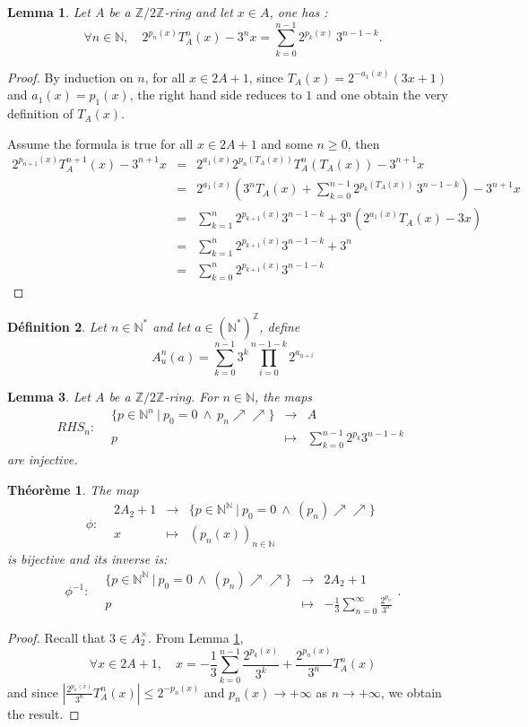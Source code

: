 \documentclass[12pt,a4paper]{article}
\newtheorem{lem}{Lemma}[section]
\newtheorem{defi}[lem]{Définition}
\newtheorem{theo}{Théorème}
\newcommand{\fonction}[5]{\displaystyle#1:\begin{array}{l|rcl}
& \displaystyle #2 & \longrightarrow & \displaystyle #3 \\
    & \displaystyle #4 & \longmapsto & \displaystyle #5 \end{array}}
\def\NN{\mathbb{N}}
\def\ZZ{\mathbb{Z}}
\begin{document}
\begin{lem}\label{lem:base}Let $A$ be a $\ZZ/2\ZZ$-ring and let $x\in A$, one has : 
$$\forall n\in \NN, \quad 2^{p_n(x)}T_A^n(x)-3^n x = \sum_{k=0}^{n-1} 2^{p_k(x)}\,3^{n-1-k} .$$
\end{lem}
\begin{proof} 
By induction on $n$, for all $x\in 2A+1$, since $T_A(x) = 2^{-a_1(x)}(3x+1)$ and $a_1(x)=p_1(x)$, the right hand side reduces to $1$ and one obtain the very definition of $T_A(x)$.

Assume the formula is true for all $x\in 2A+1$ and some $n \geq 0$, then 
\begin{eqnarray*}
2^{p_{n+1}(x)}T_A^{n+1}(x)-3^{n+1} x &=& 2^{a_{1}(x)} 2^{p_n(T_A(x))} T_A^n( T_A(x))-3^{n+1}x\\&=& 2^{a_1(x)} \left(3^n T_A(x)+ \sum_{k=0}^{n-1} 2^{p_k(T_A(x))}\,3^{n-1-k}  \right) - 3^{n+1}x  \\&=& \sum_{k=1}^{n} 2^{p_{k+1}(x)}3^{n-1-k}+3^n\left( 2^{a_1(x)}T_A(x)-3x\right)
\\&=&\sum_{k=1}^{n} 2^{p_{k+1}(x)}3^{n-1-k}+3^n 
\\&=& \sum_{k=0}^{n} 2^{p_{k+1}(x)}3^{n-1-k}
 \end{eqnarray*}
\end{proof}
\begin{defi}\label{def:define_n__n_}
Let $n\in\NN^*$ and let $a\in (\NN^*)^\ZZ$, define $$ A_{u}^n(a)=\sum_{k=0}
^{n-1}3^k\prod_{i=0}^{n-1-k}2^{a_{u+i}} $$ 
\end{defi}
\begin{lem}\label{lem:ring_maps_rhs_n_} Let $A$ be a $\ZZ/2\ZZ$-ring. 
For $n\in \NN$, the maps $$\fonction{RHS_n}{\{p\in \NN^n~|~ p_0=0~\wedge~p_n \nearrow\nearrow \} }{A}{p}{\sum_{k=0}^{n-1}2^{p_k}3^{n-1-k}} $$ 
are injective.
\end{lem}
\begin{theo}\label{theo:rep} The map $$\fonction{\phi}{2A_2+1}{\{p\in \NN^\NN~|~ p_0=0 ~\wedge~ (p_n) \nearrow\nearrow\}}{x}{(p_n(x))_{n\in \NN}} $$
is bijective and its inverse is: 
$$\fonction{\phi^{-1}}{\{p\in \NN^\NN~|~ p_0=0 ~\wedge~ (p_n) \nearrow\nearrow\}}{2A_2+1}{p}{ -\frac{1}{3}\sum_{n = 0}^{\infty}\frac{2^{p_n}}{3^{n}}}.$$
\end{theo}
\begin{proof} Recall that $3\in A_2^{\times}$. From Lemma \ref{lem:base},
 $$\forall x\in 2A+1,\quad  x = -\frac{1}{3}\sum_{k=0}^{n-1}\frac{2^{p_k(x)}}{3^k}+ \frac{2^{p_n(x)}}{3^n}T_A^n(x)$$
and since $\left|\frac{2^{p_n(x)}}{3^n}T_A^n(x)  \right| \leq 2^{-p_n(x)} $ and $p_n(x)\rightarrow +\infty$ as $n\rightarrow +\infty$, we obtain the result. 
\end{proof}
\end{document}
